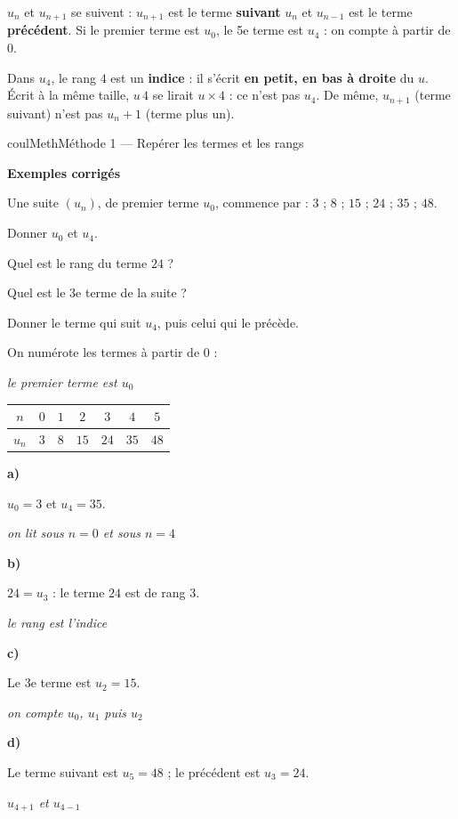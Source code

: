 \documentclass[11pt,a4paper]{article}
\makeatletter
\newcounter{lycee@signet}
\newcommand{\signet}[3][]{\stepcounter{lycee@signet}%
  \edef\lycee@dest{\if\relax\detokenize{#1}\relax
    signet.\arabic{lycee@signet}\else#1\fi}%
  \hypertarget{\lycee@dest}{}\bookmark[level=#2,dest=\lycee@dest]{#3}}
\def\textsuperscript#1{#1}\def\dfrac#1#2{#1/#2}\def\frac#1#2{#1/#2}%
\newcommand{\res}[1]{#1}
\newcounter{methode}
\newenvironment{methodebox}[1][Méthode]{\stepcounter{methode}%
  \begin{boitecours}[phantom={\signet[methode-\arabic{methode}]{2}{#1}}]{coulMeth}{#1}}%
  {\end{boitecours}}
\newcommand{\etape}[1]{\par\smallskip\textbf{\color{coulMeth}#1}\par\nobreak\smallskip}
\newcommand{\explique}[2]{\par\smallskip\noindent
  \begin{minipage}[t]{0.57\linewidth}\raggedright #1\end{minipage}\hfill
  \begin{minipage}[t]{0.40\linewidth}\raggedright\leavevmode
    {\small\itshape\color{black!60}#2}\end{minipage}\par}
\newcommand{\cas}[1]{\par\smallskip\noindent\textbf{\color{coulExo}#1}\vadjust{\nobreak}}
\newenvironment{correction}{\par}{\par}
\newcommand{\etapeexemples}{\etape{Exemples corrigés}}
\makeatother
\begin{document}
\begin{remarquebox}
$u_{n}$ et $u_{n+1}$ se suivent : $u_{n+1}$ est le terme \textbf{suivant} $u_{n}$ et
$u_{n-1}$ est le terme \textbf{précédent}. Si le premier terme est $u_{0}$, le
5\textsuperscript{e} terme est $u_{4}$ : on compte à partir de $0$.
\end{remarquebox}

\begin{remarquebox}
Dans $u_{4}$, le rang $4$ est un \textbf{indice} : il s'écrit \textbf{en petit, en bas à
droite} du $u$. Écrit à la même taille, \og $u\,4$\fg{} se lirait $u\times 4$ : ce n'est
pas $u_{4}$. De même, $u_{n+1}$ (terme suivant) n'est pas $u_{n}+1$ (terme plus un).
\end{remarquebox}

\begin{methodebox}[Méthode 1 --- Repérer les termes et les rangs]
\etapeexemples
Une suite $(u_{n})$, de premier terme $u_{0}$, commence par :
\quad $3$ ;\; $8$ ;\; $15$ ;\; $24$ ;\; $35$ ;\; $48$.
\begin{questions}[label=\alph*)]
  \item Donner $u_{0}$ et $u_{4}$.
  \item Quel est le rang du terme $24$ ?
  \item Quel est le 3\textsuperscript{e} terme de la suite ?
  \item Donner le terme qui suit $u_{4}$, puis celui qui le précède.
\end{questions}
\begin{correction}
\explique{On numérote les termes à partir de $0$ :}{le premier terme est $u_{0}$}
\begin{center}
\renewcommand{\arraystretch}{1.3}
\begin{tabular}{|c|c|c|c|c|c|c|}
\hline
$n$ & $0$ & $1$ & $2$ & $3$ & $4$ & $5$\\\hline
$u_{n}$ & $3$ & $8$ & $15$ & $24$ & $35$ & $48$\\\hline
\end{tabular}
\end{center}
\cas{a)}
\explique{$u_{0}=\res{3}$ et $u_{4}=\res{35}$.}{on lit sous $n=0$ et sous $n=4$}
\cas{b)}
\explique{$24=u_{3}$ : le terme $24$ est de rang $\res{3}$.}{le rang est l'indice}
\cas{c)}
\explique{Le 3\textsuperscript{e} terme est $u_{2}=\res{15}$.}{on compte $u_{0}$, $u_{1}$
puis $u_{2}$}
\cas{d)}
\explique{Le terme suivant est $u_{5}=\res{48}$ ; le précédent est $u_{3}=\res{24}$.}{$u_{4+1}$
et $u_{4-1}$}
\end{correction}


\end{methodebox}
\end{document}
